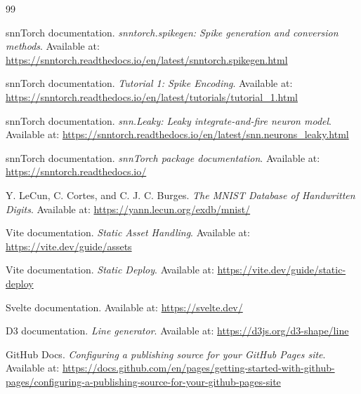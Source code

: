 \documentclass[11pt,a4paper]{article}
\begin{document}
\begin{thebibliography}{99}

snnTorch documentation. \textit{snntorch.spikegen: Spike generation and conversion methods}. Available at: \url{https://snntorch.readthedocs.io/en/latest/snntorch.spikegen.html}

snnTorch documentation. \textit{Tutorial 1: Spike Encoding}. Available at: \url{https://snntorch.readthedocs.io/en/latest/tutorials/tutorial_1.html}

snnTorch documentation. \textit{snn.Leaky: Leaky integrate-and-fire neuron model}. Available at: \url{https://snntorch.readthedocs.io/en/latest/snn.neurons_leaky.html}

snnTorch documentation. \textit{snnTorch package documentation}. Available at: \url{https://snntorch.readthedocs.io/}

Y. LeCun, C. Cortes, and C. J. C. Burges. \textit{The MNIST Database of Handwritten Digits}. Available at: \url{https://yann.lecun.org/exdb/mnist/}

Vite documentation. \textit{Static Asset Handling}. Available at: \url{https://vite.dev/guide/assets}

Vite documentation. \textit{Static Deploy}. Available at: \url{https://vite.dev/guide/static-deploy}

Svelte documentation. Available at: \url{https://svelte.dev/}

D3 documentation. \textit{Line generator}. Available at: \url{https://d3js.org/d3-shape/line}

GitHub Docs. \textit{Configuring a publishing source for your GitHub Pages site}. Available at: \url{https://docs.github.com/en/pages/getting-started-with-github-pages/configuring-a-publishing-source-for-your-github-pages-site}

\end{thebibliography}
\end{document}
